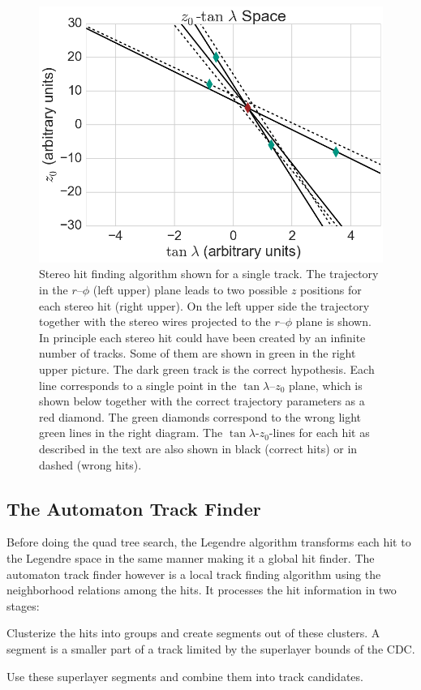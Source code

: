 \begin{figure}
 \vspace*{1cm}
 \includegraphics[scale=0.3]{figures/theory/stereo_3.png}
 \caption[Stereo Legendre algorithm.]{Stereo hit finding algorithm shown for a single track. The trajectory in the $r$--$\phi$ (left upper) plane leads to two possible $z$ positions for each stereo hit (right upper). On the left upper side the trajectory together with the stereo wires projected to the $r$--$\phi$ plane is shown. In principle each stereo hit could have been created by an infinite number of tracks. Some of them are shown in green in the right upper picture. The dark green track is the correct hypothesis. Each line corresponds to a single point in the $\tan \lambda$--$z_0$ plane, which is shown below together with the correct trajectory parameters as a red diamond. The green diamonds correspond to the wrong light green lines in the right diagram. The $\tan \lambda$-$z_0$-lines for each hit as described in the text are also shown in black (correct hits) or in dashed (wrong hits).}
 \label{fig-stereo-explained}
\end{figure}


\subsection{The Automaton Track Finder}
Before doing the quad tree search, the Legendre algorithm transforms each hit to the Legendre space in the same manner making it a global hit finder. The automaton track finder however is a local track finding algorithm using the neighborhood relations among the hits. It processes the hit information in two stages:
\begin{zlist}
  \item Clusterize the hits into groups and create segments out of these clusters. A segment is a smaller part of a track limited by the superlayer bounds of the CDC.
  \item Use these superlayer segments and combine them into track candidates.
\end{zlist}

